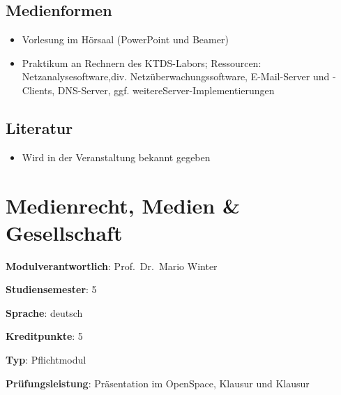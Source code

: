 \hypertarget{medienformenpathlabelmi-2017modulbeschreibungen-bachelorba_kommunikationstechnikundnetze}{%
\section*{Medienformen\label{/mi-2017/modulbeschreibungen-bachelor/BA_KommunikationstechnikundNetze}}\label{medienformenpathlabelmi-2017modulbeschreibungen-bachelorba_kommunikationstechnikundnetze}}

\begin{itemize}
\tightlist
\item
  Vorlesung im Hörsaal (PowerPoint und Beamer)
\item
  Praktikum an Rechnern des KTDS-Labors; Ressourcen:
  Netzanalysesoftware,div. Netzüberwachungssoftware, E-Mail-Server und
  -Clients, DNS-Server, ggf. weitereServer-Implementierungen
\end{itemize}

\hypertarget{literaturpathlabelmi-2017modulbeschreibungen-bachelorba_kommunikationstechnikundnetze}{%
\section*{Literatur\label{/mi-2017/modulbeschreibungen-bachelor/BA_KommunikationstechnikundNetze}}\label{literaturpathlabelmi-2017modulbeschreibungen-bachelorba_kommunikationstechnikundnetze}}

\begin{itemize}
\tightlist
\item
  Wird in der Veranstaltung bekannt gegeben
\end{itemize}

\hypertarget{medienrecht-medien-gesellschaftpathlabelmi-2017modulbeschreibungen-bachelorba_mug}{%
\chapter{Medienrecht, Medien \&
Gesellschaft\label{/mi-2017/modulbeschreibungen-bachelor/BA_MUG}}\label{medienrecht-medien-gesellschaftpathlabelmi-2017modulbeschreibungen-bachelorba_mug}}

\begin{modulHead}
\textbf{Modulverantwortlich}: Prof.~Dr.~Mario
Winter
\end{modulHead}
\begin{modulHead}
\textbf{Studiensemester}:
5
\end{modulHead}
\begin{modulHead}
\textbf{Sprache}:
deutsch
\end{modulHead}
\begin{modulHead}
\textbf{Kreditpunkte}:
5
\end{modulHead}
\begin{modulHead}
\textbf{Typ}:
Pflichtmodul
\end{modulHead}
\begin{modulHead}
\textbf{Prüfungsleistung}:
Präsentation im OpenSpace, Klausur und Klausur
\end{modulHead}



